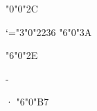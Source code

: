\explicitmathchar \comma
\Umathchardef \ordcomma "0"0"2C
\protected\def\smartcomma{%
    \futurelet\smartcomma:next\smartcomma:do}
\def\smartcomma:do{\let\smartcomma:c\comma
    \ifx0\smartcomma:next\let\smartcomma:c\ordcomma\fi
    \ifx1\smartcomma:next\let\smartcomma:c\ordcomma\fi
    \ifx2\smartcomma:next\let\smartcomma:c\ordcomma\fi
    \ifx3\smartcomma:next\let\smartcomma:c\ordcomma\fi
    \ifx4\smartcomma:next\let\smartcomma:c\ordcomma\fi
    \ifx5\smartcomma:next\let\smartcomma:c\ordcomma\fi
    \ifx6\smartcomma:next\let\smartcomma:c\ordcomma\fi
    \ifx7\smartcomma:next\let\smartcomma:c\ordcomma\fi
    \ifx8\smartcomma:next\let\smartcomma:c\ordcomma\fi
    \ifx9\smartcomma:next\let\smartcomma:c\ordcomma\fi
    \smartcomma:c}

\protected{}
\protected{}
\protected\def\smartdecimalcomma{\mathlet,\smartcomma}


\Umathcode`\:="3"0"2236 %
\Umathchardef\colon "6"0"3A

\Umathchardef\ldotp "6"0"2E
\let \period = \ldotp

\mathlet * \ast
\mathlet - \minus

\mathlet · \cdot
\Umathchardef\cdotp "6"0"B7

\protected{}

\let\neq  = \ne
\let\le   = \leq
\let\ge   = \geq
\let\owns = \ni
\let\gets = \leftarrow
\let\to   = \rightarrow
\let\land = \wedge
\let\lor  = \vee
\let\lnot = \neg

\protected{}
\protected{}
\protected{}
\protected{}
\protected{}
\protected{}

\let\widehat   = \hat
\let\widetilde = \tilde
\let\overline  = \overbar
\let\underline = \underbar

\let\intlimits=\nolimits

\explicitmathchar\intop
\explicitmathchar\iintop
\explicitmathchar\iiintop
\explicitmathchar\ointop
\explicitmathchar\oiintop
\explicitmathchar\oiiintop
\explicitmathchar\intclockwiseop
\explicitmathchar\varointclockwiseop
\explicitmathchar\ointctrclockwiseop

